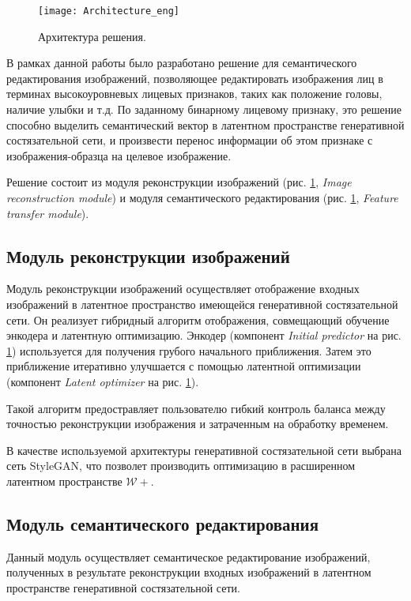 
\begin{figure}[h]
\begin{center}
    \texttt{[image: Architecture\_eng]}
    \caption{Архитектура решения.}
    \label{fig:architecture}
\end{center}
\end{figure}


В рамках данной работы было разработано решение для семантического редактирования изображений, позволяющее редактировать изображения лиц в терминах высокоуровневых лицевых признаков, таких как положение головы, наличие улыбки и т.д.
По заданному бинарному лицевому признаку, это решение способно выделить семантический вектор в латентном пространстве генеративной состязательной сети, и произвести перенос информации об этом признаке с изображения-образца на целевое изображение.

Решение состоит из модуля реконструкции изображений (рис. \ref{fig:architecture}, \emph{Image reconstruction module}) и модуля семантического редактирования (рис. \ref{fig:architecture}, \emph{Feature transfer module}).

\subsection{Модуль реконструкции изображений}
Модуль реконструкции изображений осуществляет отображение входных изображений в латентное пространство имеющейся генеративной состязательной сети.
Он реализует гибридный алгоритм отображения, совмещающий обучение энкодера и латентную оптимизацию. 
Энкодер (компонент \emph{Initial predictor} на рис. \ref{fig:architecture}) используется для получения грубого начального приближения.
Затем это приближение итеративно улучшается с помощью латентной оптимизации (компонент \emph{Latent optimizer} на рис. \ref{fig:architecture}).

Такой алгоритм предостравляет пользователю гибкий контроль баланса между точностью реконструкции изображения и затраченным на обработку временем.

В качестве используемой архитектуры генеративной состязательной сети выбрана сеть StyleGAN, что позволет производить оптимизацию в расширенном латентном пространстве $\mathcal W+$.

\subsection{Модуль семантического редактирования}
Данный модуль осуществляет семантическое редактирование изображений, полученных в результате реконструкции входных изображений в латентном пространстве генеративной состязательной сети. 


